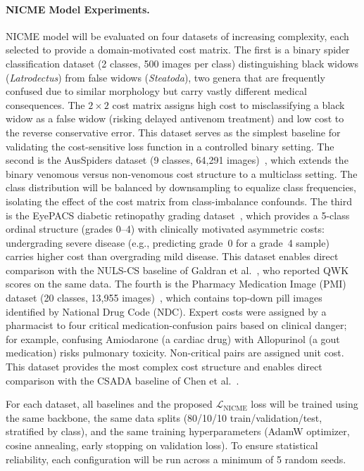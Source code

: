 \documentclass[11pt, letterpaper]{article}
\begin{document}
\paragraph{NICME Model Experiments.}
NICME model will be evaluated on four datasets of increasing complexity,
each selected to provide a domain-motivated cost matrix. The first is a binary spider classification
dataset (2 classes, 500 images per class) distinguishing black widows
(\textit{Latrodectus}) from false widows (\textit{Steatoda}), two genera that
are frequently confused due to similar morphology but carry vastly different
medical consequences. The $2 \times 2$ cost matrix assigns high cost to
misclassifying a black widow as a false widow (risking delayed antivenom
treatment) and low cost to the reverse conservative error. This dataset serves
as the simplest baseline for validating the cost-sensitive loss function in a
controlled binary setting. The second is the AusSpiders dataset (9 classes,
64,291 images)~\cite{deng2026aranet}, which extends the binary venomous
versus non-venomous cost structure to a multiclass setting. The class
distribution will be balanced by downsampling to equalize class frequencies,
isolating the effect of the cost matrix from class-imbalance confounds. The
third is the EyePACS diabetic retinopathy grading
dataset~\cite{galdran2020}, which provides a 5-class ordinal structure (grades
0--4) with clinically motivated asymmetric costs: undergrading severe disease
(e.g., predicting grade~0 for a grade~4 sample) carries higher cost than
overgrading mild disease. This dataset enables direct comparison with the
NULS-CS baseline of Galdran et al.~\cite{galdran2020}, who reported QWK scores
on the same data. The fourth is the Pharmacy Medication Image (PMI) dataset
(20 classes, 13,955 images)~\cite{chen2025csada}, which contains top-down pill
images identified by National Drug Code (NDC). Expert costs were assigned by a
pharmacist to four critical medication-confusion pairs based on clinical
danger; for example, confusing Amiodarone (a cardiac drug) with Allopurinol (a gout
medication) risks pulmonary toxicity. Non-critical pairs are assigned
unit cost. This dataset provides the most complex cost structure and enables
direct comparison with the CSADA baseline of Chen et
al.~\cite{chen2025csada}.

For each dataset, all baselines and the proposed
$\mathcal{L}_{\mathrm{NICME}}$ loss will be trained using the same backbone, the same data splits (80/10/10 train/validation/test, stratified by
class), and the same training hyperparameters (AdamW optimizer, cosine
annealing, early stopping on validation loss). To ensure statistical
reliability, each configuration will be run across a minimum of 5 random seeds.
\end{document}
